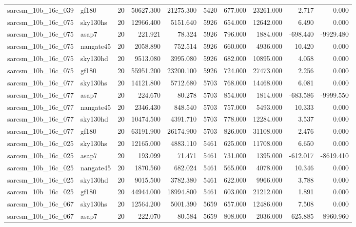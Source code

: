 \begin{tabular}{llrrrrrrrr}
sarcsm\_10b\_16c\_039 & gf180 & 20 & 50627.300 & 21275.300 & 5420 & 677.000 & 23261.000 & 2.717 & 0.000 \\
sarcsm\_10b\_16c\_075 & sky130hs & 20 & 12966.400 & 5151.640 & 5926 & 654.000 & 12642.000 & 6.490 & 0.000 \\
sarcsm\_10b\_16c\_075 & asap7 & 20 & 221.921 & 78.324 & 5926 & 796.000 & 1884.000 & -698.440 & -9929.480 \\
sarcsm\_10b\_16c\_075 & nangate45 & 20 & 2058.890 & 752.514 & 5926 & 660.000 & 4936.000 & 10.420 & 0.000 \\
sarcsm\_10b\_16c\_075 & sky130hd & 20 & 9513.080 & 3995.080 & 5926 & 682.000 & 10895.000 & 4.058 & 0.000 \\
sarcsm\_10b\_16c\_075 & gf180 & 20 & 55951.200 & 23200.100 & 5926 & 724.000 & 27473.000 & 2.256 & 0.000 \\
sarcsm\_10b\_16c\_077 & sky130hs & 20 & 14121.800 & 5712.680 & 5703 & 768.000 & 14468.000 & 6.081 & 0.000 \\
sarcsm\_10b\_16c\_077 & asap7 & 20 & 224.670 & 80.278 & 5703 & 854.000 & 1814.000 & -683.586 & -9999.550 \\
sarcsm\_10b\_16c\_077 & nangate45 & 20 & 2346.430 & 848.540 & 5703 & 757.000 & 5493.000 & 10.333 & 0.000 \\
sarcsm\_10b\_16c\_077 & sky130hd & 20 & 10474.500 & 4391.710 & 5703 & 778.000 & 12284.000 & 3.537 & 0.000 \\
sarcsm\_10b\_16c\_077 & gf180 & 20 & 63191.900 & 26174.900 & 5703 & 826.000 & 31108.000 & 2.476 & 0.000 \\
sarcsm\_10b\_16c\_025 & sky130hs & 20 & 12165.000 & 4883.110 & 5461 & 625.000 & 11708.000 & 6.650 & 0.000 \\
sarcsm\_10b\_16c\_025 & asap7 & 20 & 193.099 & 71.471 & 5461 & 731.000 & 1395.000 & -612.017 & -8619.410 \\
sarcsm\_10b\_16c\_025 & nangate45 & 20 & 1870.560 & 682.024 & 5461 & 565.000 & 4078.000 & 10.346 & 0.000 \\
sarcsm\_10b\_16c\_025 & sky130hd & 20 & 9015.500 & 3782.380 & 5461 & 622.000 & 9966.000 & 3.788 & 0.000 \\
sarcsm\_10b\_16c\_025 & gf180 & 20 & 44944.000 & 18994.800 & 5461 & 603.000 & 21212.000 & 1.891 & 0.000 \\
sarcsm\_10b\_16c\_067 & sky130hs & 20 & 12564.200 & 5001.390 & 5659 & 657.000 & 12486.000 & 7.508 & 0.000 \\
sarcsm\_10b\_16c\_067 & asap7 & 20 & 222.070 & 80.584 & 5659 & 808.000 & 2036.000 & -625.885 & -8960.960 \\

\end{tabular}
